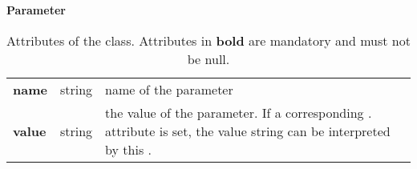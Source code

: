 \begin{table}[ht]
\small
{}\textwidth
 \textbf{\normalsize Parameter}\vspace{0.25em}\\
 \begin{tabulary}{1.0\textwidth}{llL}
 \toprule
  &    & \\
 \midrule
\textbf{name}  & string & name of the parameter \\
\textbf{value} & string & the value of the parameter. If a corresponding . attribute is set, the value string can be interpreted by this . \\
\bottomrule
\end{tabulary}
\caption[Attributes of the  class]{Attributes of the  class. Attributes in \textbf{bold} are mandatory and must not be null.}
\label{tab:param}
\end{table}

